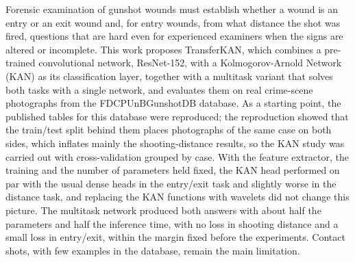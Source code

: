 Forensic examination of gunshot wounds must establish whether a wound is an entry or an exit wound and, for entry wounds, from what distance the shot was fired, questions that are hard even for experienced examiners when the signs are altered or incomplete. This work proposes TransferKAN, which combines a pre-trained convolutional network, ResNet-152, with a Kolmogorov-Arnold Network (KAN) as its classification layer, together with a multitask variant that solves both tasks with a single network, and evaluates them on real crime-scene photographs from the FDCPUnBGunshotDB database. As a starting point, the published tables for this database were reproduced; the reproduction showed that the train/test split behind them places photographs of the same case on both sides, which inflates mainly the shooting-distance results, so the KAN study was carried out with cross-validation grouped by case. With the feature extractor, the training and the number of parameters held fixed, the KAN head performed on par with the usual dense heads in the entry/exit task and slightly worse in the distance task, and replacing the KAN functions with wavelets did not change this picture. The multitask network produced both answers with about half the parameters and half the inference time, with no loss in shooting distance and a small loss in entry/exit, within the margin fixed before the experiments. Contact shots, with few examples in the database, remain the main limitation.
